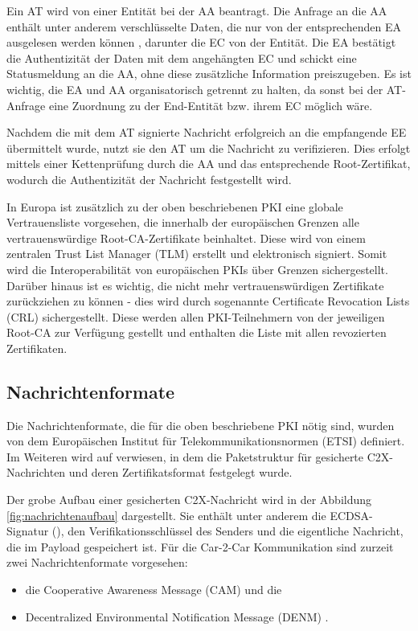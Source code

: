 Ein AT wird von einer Entität bei der AA beantragt. Die Anfrage an die AA enthält unter anderem verschlüsselte Daten, die nur von der entsprechenden EA ausgelesen werden können \cite{ETSI2018}, darunter die EC von der Entität. Die EA bestätigt die Authentizität der Daten mit dem angehängten EC und schickt eine Statusmeldung an die AA, ohne diese zusätzliche Information preiszugeben. Es ist wichtig, die EA und AA organisatorisch getrennt zu halten, da sonst bei der AT-Anfrage eine Zuordnung zu der End-Entität bzw. ihrem EC möglich wäre.


Nachdem die mit dem AT signierte Nachricht erfolgreich an die empfangende EE übermittelt wurde, nutzt sie den AT um die Nachricht zu verifizieren. Dies erfolgt mittels einer Kettenprüfung durch die AA und das entsprechende Root-Zertifikat, wodurch die Authentizität der Nachricht festgestellt wird.

In Europa ist zusätzlich zu der oben beschriebenen PKI eine globale Vertrauensliste vorgesehen, die innerhalb der europäischen Grenzen alle vertrauenswürdige Root-CA-Zertifikate beinhaltet. Diese wird von einem zentralen Trust List Manager (TLM) erstellt und elektronisch signiert. Somit wird die Interoperabilität von europäischen PKIs über Grenzen sichergestellt. Darüber hinaus ist es wichtig, die nicht mehr vertrauenswürdigen Zertifikate zurückziehen zu können - dies wird durch sogenannte Certificate Revocation Lists (CRL) sichergestellt. Diese werden allen PKI-Teilnehmern von der jeweiligen Root-CA zur Verfügung gestellt und enthalten die Liste mit allen revozierten Zertifikaten.  

\subsection{Nachrichtenformate}
\label{sec:FirstContentSection:SecondSubSection}

Die Nachrichtenformate, die für die oben beschriebene PKI nötig sind, wurden von dem Europäischen Institut für Telekommunikationsnormen (ETSI) definiert. Im Weiteren wird auf \cite{ETSI2018} verwiesen, in dem die Paketstruktur für gesicherte C2X-Nachrichten und deren Zertifikatsformat festgelegt wurde. 

Der grobe Aufbau einer gesicherten C2X-Nachricht wird in der Abbildung \ref{fig:nachrichtenaufbau} dargestellt. Sie enthält unter anderem die ECDSA-Signatur (\cite{Barker2013}), den Verifikationsschlüssel des Senders und die eigentliche Nachricht, die im Payload gespeichert ist. Für die Car-2-Car Kommunikation sind zurzeit zwei Nachrichtenformate vorgesehen:
\begin{itemize}
	\item die Cooperative Awareness Message (CAM) und die 
	\item Decentralized Environmental Notification Message (DENM) \cite{ETSI2013}.
\end{itemize}

